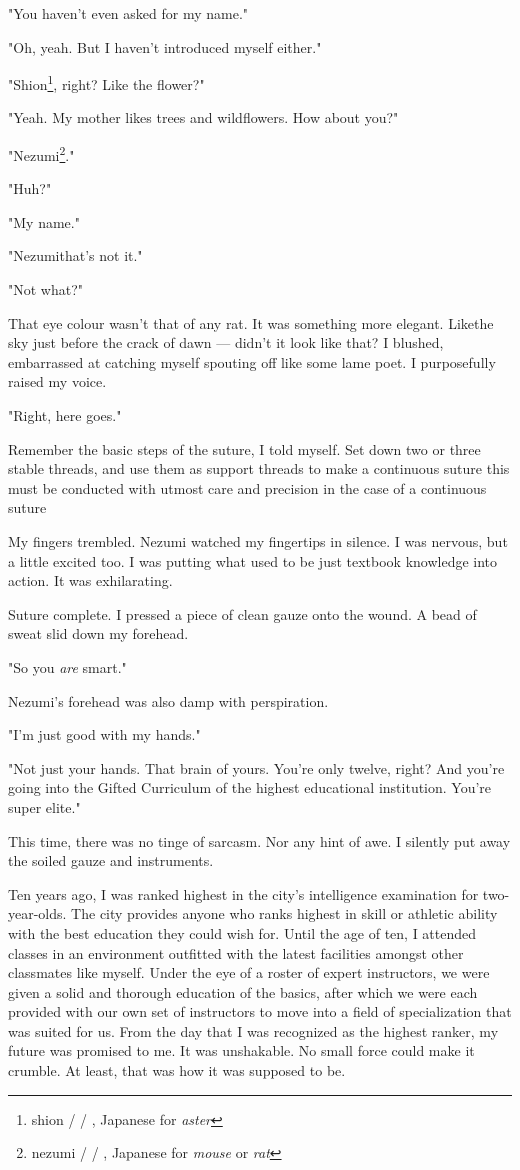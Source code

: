 "You haven't even asked for my name."

"Oh, yeah. But I haven't introduced myself either."

"Shion\footnote{shion /  / , Japanese for \emph{aster}}, right? Like the flower?"

"Yeah. My mother likes trees and wildflowers. How about you?"

"Nezumi\footnote{nezumi /  / , Japanese for \emph{mouse} or \emph{rat}}."

"Huh?"

"My name."

"Nezumi\el that's not it."

"Not what?"

That eye colour wasn't that of any rat. It was something more elegant.
Like\el the sky just before the crack of dawn --- didn't it look like
that? I blushed, embarrassed at catching myself spouting off like some
lame poet. I purposefully raised my voice.

"Right, here goes."

Remember the basic steps of the suture, I told myself. Set down two or
three stable threads, and use them as support threads to make a
continuous suture \el this must be conducted with utmost care and
precision \el in the case of a continuous suture\el 

My fingers trembled. Nezumi watched my fingertips in silence. I was
nervous, but a little excited too. I was putting what used to be just
textbook knowledge into action. It was exhilarating.

Suture complete. I pressed a piece of clean gauze onto the wound. A bead
of sweat slid down my forehead.

"So you \emph{are} smart."

Nezumi's forehead was also damp with perspiration.

"I'm just good with my hands."

"Not just your hands. That brain of yours. You're only twelve, right?
And you're going into the Gifted Curriculum of the highest educational
institution. You're super elite."

This time, there was no tinge of sarcasm. Nor any hint of awe. I
silently put away the soiled gauze and instruments.

Ten years ago, I was ranked highest in the city's intelligence
examination for two-year-olds. The city provides anyone who ranks
highest in skill or athletic ability with the best education they could
wish for. Until the age of ten, I attended classes in an environment
outfitted with the latest facilities amongst other classmates like
myself. Under the eye of a roster of expert instructors, we were given a
solid and thorough education of the basics, after which we were each
provided with our own set of instructors to move into a field of
specialization that was suited for us. From the day that I was
recognized as the highest ranker, my future was promised to me. It was
unshakable. No small force could make it crumble. At least, that was how
it was supposed to be.

